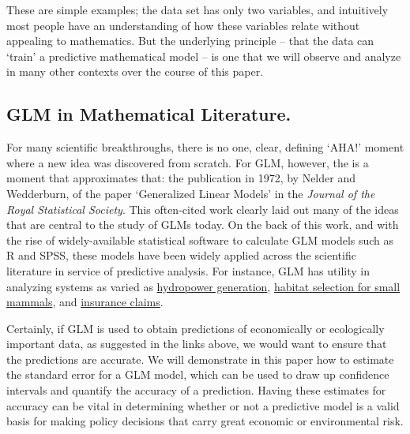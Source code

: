 \documentclass[12pt]{article}\usepackage[]{graphicx}\usepackage[]{color}
\begin{document}
These are simple examples; the data set has only two variables, and intuitively most people have an understanding of how these variables relate 
without appealing to mathematics.  But the underlying principle -- that the data can `train' a predictive mathematical model -- is one that we will
observe and analyze in many other contexts over the course of this paper.


	\subsection{GLM in Mathematical Literature.}
		For many scientific breakthroughs, there is no one, clear, defining `AHA!' moment where a new idea was discovered from scratch. For
GLM, however, the is a moment that approximates that: the publication in 1972, by Nelder and Wedderburn, of the paper `Generalized Linear Models'
in the \textit{Journal of the Royal Statistical Society}.  This often-cited work clearly laid out many of the ideas that are central to the study 
of GLMs today.  On the back of this work, and with the rise of widely-available statistical software to calculate GLM models such as R and SPSS, 
these models have been widely applied across the scientific literature in service of predictive analysis.  For instance, GLM has utility in
analyzing systems as varied as 
\href{https://www.sciencedirect.com/science/article/pii/S037877961630222X}{hydropower generation}, 
\href{https://www.sciencedirect.com/science/article/pii/S1470160X17306271}{habitat selection for small mammals}, and 
\href{https://www.sciencedirect.com/science/article/pii/S0167668715303358}{insurance claims}.  

Certainly, if GLM is used to obtain predictions of economically or ecologically important data, as suggested in the links above, we would want to 
ensure that the predictions are accurate. We will demonstrate in this paper how to estimate the standard error for a GLM model, which can be 
used to draw up confidence intervals and quantify the accuracy of a prediction.  Having these estimates for accuracy can be vital in determining
whether or not a predictive model is a valid basis for making policy decisions that carry great economic or environmental risk.

\end{document}
